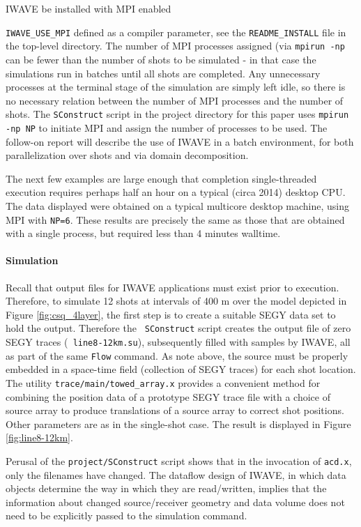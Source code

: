 IWAVE be installed with MPI enabled {{\tt IWAVE\_USE\_MPI} defined as a
compiler parameter, see the {\tt README\_INSTALL} file in the top-level
directory. The number of MPI processes assigned (via {\tt mpirun -np}
can be fewer than the number of shots to be simulated - in that case
the simulations run in batches until all shots are completed. Any
unnecessary processes at the terminal stage of the simulation are simply left
idle, so there is no necessary relation between the number of MPI
processes and the number of shots. The {\tt SConstruct} script in the
project directory for this paper uses {\tt mpirun -np NP} to initiate
MPI and assign the number of processes to be used. The follow-on
report will describe the use of IWAVE in a batch environment, for both
parallelization over shots and via domain decomposition.

The next few examples are large enough that completion single-threaded
execution requires perhaps half an hour on a typical (circa 2014) desktop
CPU.  The data displayed were obtained on a typical multicore desktop
machine, using MPI with {\tt NP=6}. These results are precisely the
same as those that are obtained with a single process, but required
less than 4 minutes walltime.

\noindent \paragraph{Simulation}
Recall that output files for IWAVE applications must exist prior to
execution. Therefore, to simulate 12 shots at intervals of 400 m over
the model depicted in Figure \ref{fig:csq_4layer}, the first step is
to create a suitable SEGY data set to hold the output. Therefore the {\tt
  SConstruct} script creates the output file of zero SEGY traces ({\tt
  line8-12km.su}), subsequently filled with samples by IWAVE, all as
part of the same {\tt Flow} command. As note above, the source must
be properly embedded in a space-time field (collection of SEGY traces)
for each shot location. The utility {\tt trace/main/towed\_array.x}
provides a convenient method for combining the position data of a
prototype SEGY trace file with a choice of source array to produce
translations of a source array to correct shot positions. Other
parameters are as in the single-shot case. The result is displayed in
Figure \ref{fig:line8-12km}.

Perusal of the {\tt project/SConstruct} script shows that in the
invocation of {\tt acd.x}, only the filenames have changed. The
dataflow design of IWAVE, in which data objects determine the way in
which they are read/written, implies that the information about
changed source/receiver geometry and data volume does not need to be
explicitly passed to the simulation command.

}
